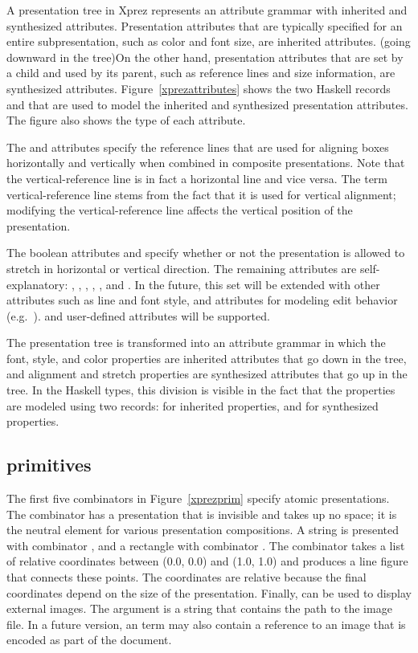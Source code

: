 A presentation tree in {Xprez} represents an attribute grammar with inherited and synthesized attributes. Presentation attributes that are typically specified for an entire subpresentation, such as color and font size, are inherited attributes.  \bc (going downward in the tree)\ec On the other hand, presentation attributes that are set by a child and used by its parent, such as  reference lines and size information, are synthesized attributes. Figure~\ref{xprezattributes} shows the two Haskell records   and  that are used to model the inherited and synthesized presentation attributes. The figure also shows the type of each attribute. 

The  and  attributes specify the reference lines that are used for aligning boxes horizontally and vertically when combined in composite presentations. Note that the vertical-reference line is in fact a horizontal line and vice versa. The term vertical-reference line stems from the fact that it is used for vertical alignment; modifying the vertical-reference line affects the vertical position of the presentation. 

The boolean attributes  and  specify whether or not the presentation is allowed to stretch in horizontal or vertical direction. The remaining attributes are self-explanatory: , , , , , and . In the future, this set will be extended with other attributes such as line and font style, and attributes for modeling edit behavior (e.g.\ ).
 \bc and user-defined attributes will be supported. \ec

\bc
The presentation tree is transformed into an attribute grammar in which the font, style, and color properties are inherited attributes that go down in the tree, and alignment and stretch properties are synthesized attributes that go up in the tree. In the Haskell types, this division is visible in the fact that the properties are modeled using two records:  for inherited properties, and  for synthesized properties.
\ec

%																
\subsection{{\Xprez} primitives} \label{sect:primitives}

The first five combinators in Figure~\ref{xprezprim} specify atomic presentations. The  combinator has a presentation that is invisible and takes up no space; it is the neutral element for various presentation compositions. A string is presented with combinator , and a rectangle with combinator . The  combinator takes a list of relative coordinates between (0.0, 0.0) and (1.0, 1.0) and produces a line figure that connects these points. The coordinates are relative because the final coordinates depend on the size of the  presentation. Finally,  can be used to display external images. The argument is a string that contains the path to the image file. In a future version, an  term may also contain a reference to an image that is encoded as part of the document.

